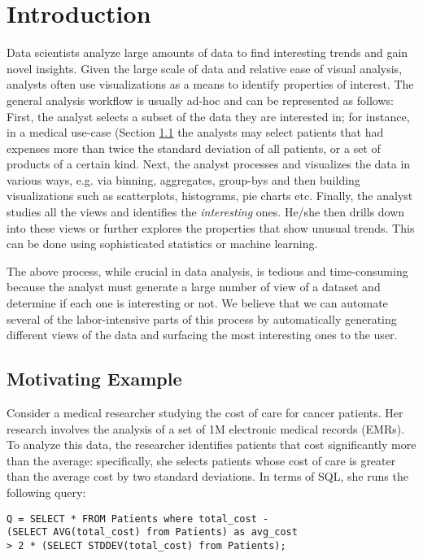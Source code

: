 \section{Introduction}
\label{sec:intro}
Data scientists analyze large amounts of data to find interesting trends and
gain novel insights. Given the large scale of data and relative ease of visual
analysis, analysts often use visualizations as a means to identify properties of
interest. The general analysis workflow is usually ad-hoc and can be represented
as follows: First, the analyst selects a subset of the data they are interested
in; for instance, in a medical use-case (Section \ref{subsec:motivation_example}
the analysts may select patients that had expenses more than twice the standard
deviation of all patients, or a set of products of a certain kind. Next, the
analyst processes and visualizes the data in various ways, e.g. via binning,
aggregates, group-bys and then building visualizations such as scatterplots,
histograms, pie charts etc. Finally, the analyst studies all the views and
identifies the {\it interesting} ones. He/she then drills down into these views
or further explores the properties that show unusual trends. This can be done
using sophisticated statistics or machine learning.

The above process, while crucial in data analysis, is tedious and time-consuming
because the analyst must generate a large number of view of a dataset and
determine if each one is interesting or not. We believe that we can automate
several of the labor-intensive parts of this process by automatically generating
different views of the data and surfacing the most interesting ones to the user.

\subsection{Motivating Example}
\label{subsec:motivation_example}

Consider a medical researcher studying the cost of care for cancer patients. Her
research involves the analysis of a set of 1M electronic medical records (EMRs).
To analyze this data, the researcher identifies patients that cost
significantly more than the average: specifically, she selects patients whose
cost of care is greater than the average cost by two standard deviations. In
terms of SQL, she runs the following query: \\

\noindent 
\begin{small}
\begin{verbatim}
Q = SELECT * FROM Patients where total_cost - 
(SELECT AVG(total_cost) from Patients) as avg_cost
> 2 * (SELECT STDDEV(total_cost) from Patients);
\end{verbatim}
\end{small}


